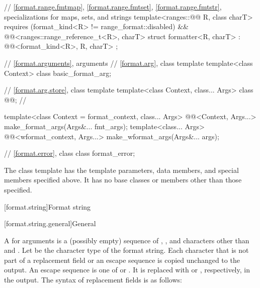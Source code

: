 \begin{codeblock}
{  // \ref{format.range.fmtmap}, \ref{format.range.fmtset}, \ref{format.range.fmtstr}, specializations for maps, sets, and strings
  template<ranges::@@ R, class charT>
    requires (format_kind<R> != range_format::disabled) &&
             @@<ranges::range_reference_t<R>, charT>
  struct formatter<R, charT> : @@<format_kind<R>, R, charT> { };

  // \ref{format.arguments}, arguments
  // \ref{format.arg}, class template 
  template<class Context> class basic_format_arg;

  // \ref{format.arg.store}, class template 
  template<class Context, class... Args> class @@;        // \expos

  template<class Context = format_context, class... Args>
    @@<Context, Args...>
      make_format_args(Args&... fmt_args);
  template<class... Args>
    @@<wformat_context, Args...>
      make_wformat_args(Args&... args);

  // \ref{format.error}, class 
  class format_error;
}
\end{codeblock}


\pnum
The class template 
has the template parameters, data members, and special members specified above. It has no base classes or members other than those specified.

[format.string]{Format string}

[format.string.general]{General}

\pnum
A  for arguments  is
a (possibly empty) sequence of
,
,
and characters other than \tcode{\{} and \tcode{\}}.
Let  be the character type of the format string.
Each character that is not part of
a replacement field or an escape sequence
is copied unchanged to the output.
An escape sequence is one of \tcode{\{\{} or \tcode{\}\}}.
It is replaced with \tcode{\{} or \tcode{\}}, respectively, in the output.
The syntax of replacement fields is as follows:

\begin{ncbnf}
\br
    \terminal{\{}   \terminal{\}}
\end{ncbnf}

